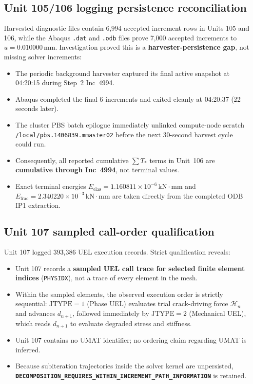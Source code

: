 \subsection{Unit 105/106 logging persistence reconciliation}
Harvested diagnostic files contain 6,994 accepted increment rows in Units 105 and 106, while the Abaqus \texttt{.dat} and \texttt{.odb} files prove 7,000 accepted increments to $u = 0.010000\,\mathrm{mm}$. Investigation proved this is a \textbf{harvester-persistence gap}, not missing solver increments:
\begin{itemize}
  \item The periodic background harvester captured its final active snapshot at 04:20:15 during Step~2 Inc~4994.
  \item Abaqus completed the final 6 increments and exited cleanly at 04:20:37 (22 seconds later).
  \item The cluster PBS batch epilogue immediately unlinked compute-node scratch \texttt{/local/pbs.1406839.mmaster02} before the next 30-second harvest cycle could run.
  \item Consequently, all reported cumulative $\sum T_*$ terms in Unit~106 are \textbf{cumulative through Inc~4994}, not terminal values.
  \item Exact terminal energies $E_{\mathrm{elas}} = 1.160811\times 10^{-6}\,\mathrm{kN\cdot mm}$ and $E_{\mathrm{frac}} = 2.340220\times 10^{-3}\,\mathrm{kN\cdot mm}$ are taken directly from the completed ODB IP1 extraction.
\end{itemize}

\subsection{Unit 107 sampled call-order qualification}
Unit 107 logged 393,386 UEL execution records. Strict qualification reveals:
\begin{itemize}
  \item Unit 107 records a \textbf{sampled UEL call trace for selected finite element indices} (\texttt{PHYSIDX}), not a trace of every element in the mesh.
  \item Within the sampled elements, the observed execution order is strictly sequential: $\mathrm{JTYPE}=1$ (Phase UEL) evaluates trial crack-driving force $\mathcal{H}_n$ and advances $d_{n+1}$, followed immediately by $\mathrm{JTYPE}=2$ (Mechanical UEL), which reads $d_{n+1}$ to evaluate degraded stress and stiffness.
  \item Unit 107 contains no UMAT identifier; no ordering claim regarding UMAT is inferred.
  \item Because subiteration trajectories inside the solver kernel are unpersisted, \textbf{\texttt{DECOMPOSITION\_REQUIRES\_WITHIN\_INCREMENT\_PATH\_INFORMATION}} is retained.
\end{itemize}

